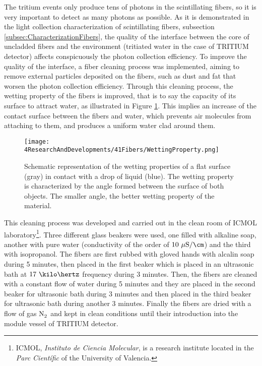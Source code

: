 
The tritium events only produce tens of photons in the scintillating fibers, so it is very important to detect as many photons as possible. As it is demonstrated in the light collection characterization of scintillating fibers, subsection \ref{subsec:CharacterizationFibers}, the quality of the interface between the core of uncladded fibers and the environment (tritiated water in the case of TRITIUM detector) affects conspicuously the photon collection efficiency. To improve the quality of the interface, a fiber cleaning process was implemented, aiming to remove external particles deposited on the fibers, such as dust and fat that worsen the photon collection efficiency.  Through this cleaning process, the wetting property of the fibers is improved, that is to say the capacity of its surface to attract water, as illustrated in Figure \ref{fig:WettingProperty}. This implies an increase of the contact surface between the fibers and water, which prevents air molecules from attaching to them, and produces a uniform water clad around them.


\begin{figure}[h]
\centering
\texttt{[image: 4ResearchAndDevelopments/41Fibers/WettingProperty.png]}
\caption{Schematic representation of the wetting properties of a flat surface (gray) in contact with a drop of liquid (blue). The wetting property is characterized by the angle formed between the surface of both objects. The smaller angle, the better wetting property of the material. \cite{WettingProperty}\label{fig:WettingProperty}}
\end{figure}

This cleaning process  was developed and carried out in the clean room of ICMOL laboratory\footnote{ICMOL, \textit{Instituto de Ciencia Molecular}, is a research institute located in the \textit{Parc Científic} of the University of Valencia.}. Three different glass beakers were used, one filled with alkaline soap, another with pure water (conductivity of the order of $10~\mu\text{S}/\cm$) and the third with isopropanol. The fibers are first rubbed with gloved hands with alcalin soap during 5 minutes, then placed in the first beaker which is placed in an ultrasonic bath at $17~\kilo\hertz$ frequency during 3 minutes. Then, the fibers are cleaned with a constant flow of water during 5 minutes and they are placed in the second beaker for ultrasonic bath during 3 minutes and then placed in the third beaker for ultrasonic bath during another 3 minutes. Finally the fibers are dried with a flow of gas $\ce{N_2}$ and kept in clean conditions until their introduction into the module vessel of TRITIUM detector.


